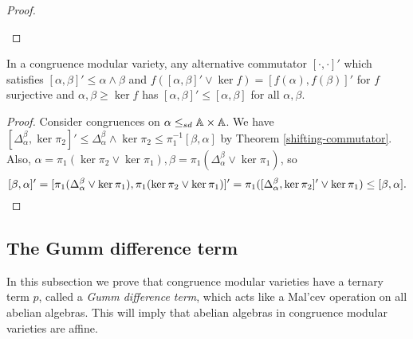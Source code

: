\documentclass[letterpaper,11pt]{article}
\begin{document}
\begin{proof}
\begin{center}
\end{center}
\end{proof}

\begin{thm} In a congruence modular variety, any alternative commutator $[\cdot,\cdot]'$ which satisfies $[\alpha,\beta]' \le \alpha \wedge \beta$ and $f([\alpha,\beta]'\vee \ker f) = [f(\alpha),f(\beta)]'$ for $f$ surjective and $\alpha,\beta \ge \ker f$ has $[\alpha,\beta]' \le [\alpha,\beta]$ for all $\alpha, \beta$.
\end{thm}
\begin{proof} Consider congruences on $\alpha \le_{sd} \mathbb{A}\times \mathbb{A}$. We have $[\Delta_\alpha^\beta,\ker \pi_2]' \le \Delta_\alpha^\beta\wedge \ker \pi_2 \le \pi_1^{-1}[\beta,\alpha]$ by Theorem \ref{shifting-commutator}. Also, $\alpha = \pi_1(\ker \pi_2 \vee \ker \pi_1), \beta = \pi_1(\Delta_\alpha^\beta \vee \ker \pi_1)$, so
\[
[\beta,\alpha]' = [\pi_1(\Delta_\alpha^\beta \vee \ker \pi_1), \pi_1(\ker \pi_2 \vee \ker \pi_1)]' = \pi_1([\Delta_\alpha^\beta, \ker \pi_2]' \vee \ker \pi_1) \le [\beta,\alpha].\qedhere
\]
\end{proof}


\subsection{The Gumm difference term}

In this subsection we prove that congruence modular varieties have a ternary term $p$, called a \emph{Gumm difference term}, which acts like a Mal'cev operation on all abelian algebras. This will imply that abelian algebras in congruence modular varieties are affine.
\end{document}
